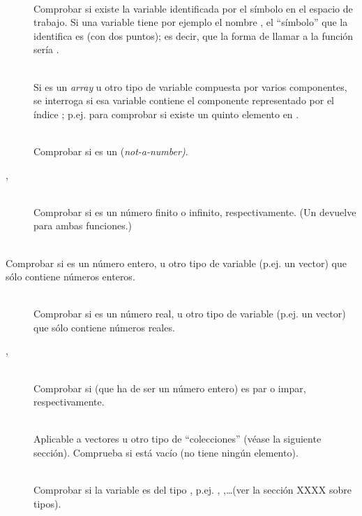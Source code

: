 ﻿\documentclass[spanish]{article}
\begin{document}
\begin{description}
  \item[] \hfill \\
  Comprobar si existe la variable identificada por el símbolo  en el espacio de trabajo. Si una variable tiene por ejemplo el nombre , el ``símbolo'' que la identifica es  (con dos puntos); es decir, que la forma de llamar a la función sería .
  \item[] \hfill \\
  Si  es un \emph{array} u otro tipo de variable compuesta por varios componentes, se interroga si esa variable contiene el componente representado por el índice ; p.ej.  para comprobar si existe un quinto elemento en .
  \item[] \hfill \\
  Comprobar si  es un  (\emph{not-a-number)}.
  \item[, ] \hfill \\
  Comprobar si  es un número finito o infinito, respectivamente. (Un  devuelve  para ambas funciones.)
  \item[ \hfill \\
  Comprobar si  es un número entero, u otro tipo de variable (p.ej. un vector) que sólo contiene números enteros.
  \item[\code{isreal(x)}] \hfill \\
  Comprobar si  es un número real, u otro tipo de variable (p.ej. un vector) que sólo contiene números reales.
  \item[, ] \hfill \\
  Comprobar si  (que ha de ser un número entero) es par o impar, respectivamente.
  \item[] \hfill \\
  Aplicable a vectores u otro tipo de ``colecciones'' (véase la siguiente sección). Comprueba si  está vacío (no tiene ningún elemento).
  \item[] \hfill \\
  Comprobar si la variable  es del tipo , p.ej. , ,\ldots (ver la sección XXXX sobre tipos).
  \item[] \hfill \\

\end{description}
\end{document}
